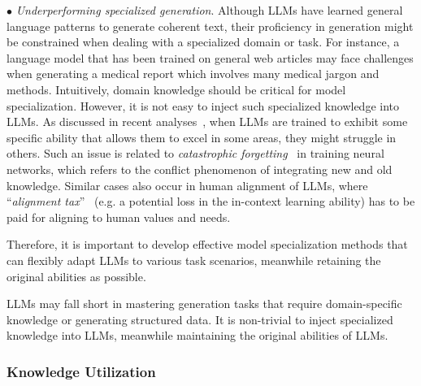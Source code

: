 {{{{{$\bullet$ {\emph{Underperforming specialized generation}}. Although LLMs have learned general language patterns to generate coherent text, their proficiency in generation might be constrained when dealing  with a specialized domain or task. {For instance, a language model that has been trained on general web articles may face challenges when generating a medical report  which involves many medical jargon and methods.} Intuitively, domain knowledge should be critical for model specialization. However, it is not easy to inject such specialized knowledge into LLMs. As discussed in recent analyses~\cite{FU-blog-2022-how,Ye-arxiv-2023-A}, when LLMs are trained to exhibit some specific ability that allows them to excel in some areas, they might struggle in others. Such an issue is related to \emph{catastrophic forgetting}~\cite{Michael-Psychology-1989-Catastrophic, Kemker-AAAI-2018-Measuring} in training neural networks, which refers to the conflict phenomenon of integrating new and old knowledge. Similar cases also occur in human alignment of LLMs, where ``\emph{alignment tax}''~\cite{Ouyang-arxiv-2022-Training} (e.g. a potential loss in the in-context learning  ability) has to be paid for aligning to human values and needs.  

Therefore, it is important to develop effective model specialization methods  that can flexibly adapt LLMs to various task scenarios,  meanwhile retaining the original abilities as possible.

\begin{center}
\begin{tcolorbox}[colback=blue!5!white,colframe=blue!55!black,width=0.46\textwidth,title={Underperforming Specialized Generation}] LLMs may fall short in mastering generation tasks that require domain-specific knowledge or generating structured data. It is non-trivial to inject specialized knowledge into LLMs, meanwhile maintaining the original abilities of LLMs.
\end{tcolorbox}
\end{center}

\subsubsection{Knowledge Utilization}

}}}}}
